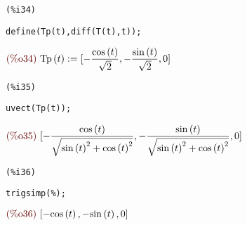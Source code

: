 \documentclass[12pt]{article}
\begin{document}
\noindent
\begin{minipage}[t]{8ex}{\color{red}\bf
\begin{verbatim}
(%i34) 
\end{verbatim}}
\end{minipage}
\begin{minipage}[t]{\textwidth}{\color{blue}
\begin{verbatim}
define(Tp(t),diff(T(t),t));
\end{verbatim}}
\end{minipage}
\begin{math}\displaystyle
\parbox{8ex}{\color{labelcolor}(\%o34) }
\mathrm{Tp}\left( t\right) :=[-\frac{\mathrm{cos}\left( t\right) }{\sqrt{2}},-\frac{\mathrm{sin}\left( t\right) }{\sqrt{2}},0]
\end{math}

\noindent
\begin{minipage}[t]{8ex}{\color{red}\bf
\begin{verbatim}
(%i35) 
\end{verbatim}}
\end{minipage}
\begin{minipage}[t]{\textwidth}{\color{blue}
\begin{verbatim}
uvect(Tp(t));
\end{verbatim}}
\end{minipage}
\begin{math}\displaystyle
\parbox{8ex}{\color{labelcolor}(\%o35) }
[-\frac{\mathrm{cos}\left( t\right) }{\sqrt{{\mathrm{sin}\left( t\right) }^{2}+{\mathrm{cos}\left( t\right) }^{2}}},-\frac{\mathrm{sin}\left( t\right) }{\sqrt{{\mathrm{sin}\left( t\right) }^{2}+{\mathrm{cos}\left( t\right) }^{2}}},0]
\end{math}

\noindent
\begin{minipage}[t]{8ex}{\color{red}\bf
\begin{verbatim}
(%i36) 
\end{verbatim}}
\end{minipage}
\begin{minipage}[t]{\textwidth}{\color{blue}
\begin{verbatim}
trigsimp(%);
\end{verbatim}}
\end{minipage}
\begin{math}\displaystyle
\parbox{8ex}{\color{labelcolor}(\%o36) }
[-\mathrm{cos}\left( t\right) ,-\mathrm{sin}\left( t\right) ,0]
\end{math}
\end{document}
